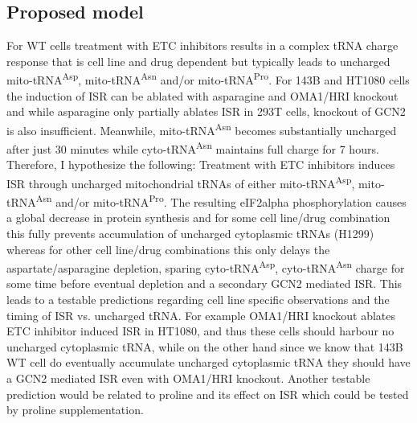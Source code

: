 \subsection{Proposed model}
For WT cells treatment with ETC inhibitors results in a complex tRNA charge response that is cell line and drug dependent but typically leads to uncharged mito-tRNA\textsuperscript{Asp}, mito-tRNA\textsuperscript{Asn} and/or mito-tRNA\textsuperscript{Pro}.
For 143B and HT1080 cells the induction of ISR can be ablated with asparagine and OMA1/HRI knockout and while asparagine only partially ablates ISR in 293T cells, knockout of GCN2 is also insufficient.
Meanwhile, mito-tRNA\textsuperscript{Asn} becomes substantially uncharged after just 30 minutes while cyto-tRNA\textsuperscript{Asn} maintains full charge for 7 hours.
Therefore, I hypothesize the following:
Treatment with ETC inhibitors induces ISR through uncharged mitochondrial tRNAs of either mito-tRNA\textsuperscript{Asp}, mito-tRNA\textsuperscript{Asn} and/or mito-tRNA\textsuperscript{Pro}.
The resulting eIF2alpha phosphorylation causes a global decrease in protein synthesis and for some cell line/drug combination this fully prevents accumulation of uncharged cytoplasmic tRNAs (H1299) whereas for other cell line/drug combinations this only delays the aspartate/asparagine depletion, sparing cyto-tRNA\textsuperscript{Asp}, cyto-tRNA\textsuperscript{Asn} charge for some time before eventual depletion and a secondary GCN2 mediated ISR.
This leads to a testable predictions regarding cell line specific observations and the timing of ISR vs. uncharged tRNA.
For example OMA1/HRI knockout ablates ETC inhibitor induced ISR in HT1080, and thus these cells should harbour no uncharged cytoplasmic tRNA, while on the other hand since we know that 143B WT cell do eventually accumulate uncharged cytoplasmic tRNA they should have a GCN2 mediated ISR even with OMA1/HRI knockout.
Another testable prediction would be related to proline and its effect on ISR which could be tested by proline supplementation.

